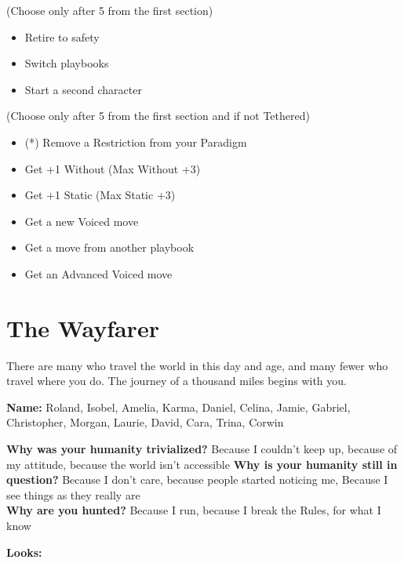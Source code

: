 \documentclass[
  oneside,
  statementpaper,
  9pt]{memoir}
\begin{document}
(Choose only after 5 from the first section)

\begin{itemize}
\tightlist
\item
  Retire to safety
\item
  Switch playbooks
\item
  Start a second character
\end{itemize}

(Choose only after 5 from the first section and if not Tethered)

\begin{itemize}
\tightlist
\item
  (*) Remove a Restriction from your Paradigm
\item
  Get +1 Without (Max Without +3)
\item
  Get +1 Static (Max Static +3)
\item
  Get a new Voiced move
\item
  Get a move from another playbook
\item
  Get an Advanced Voiced move
\end{itemize}

\newpage

\hypertarget{the-wayfarer}{%
\section{The Wayfarer}\label{the-wayfarer}}

There are many who travel the world in this day and age, and many fewer
who travel where you do. The journey of a thousand miles begins with
you.

\textbf{Name:} Roland, Isobel, Amelia, Karma, Daniel, Celina, Jamie,
Gabriel, Christopher, Morgan, Laurie, David, Cara, Trina, Corwin

\textbf{Why was your humanity trivialized?} Because I couldn't keep up,
because of my attitude, because the world isn't accessible \textbf{Why
is your humanity still in question?} Because I don't care, because
people started noticing me, Because I see things as they really are\\
\textbf{Why are you hunted?} Because I run, because I break the Rules,
for what I know

\textbf{Looks:}
\end{document}
